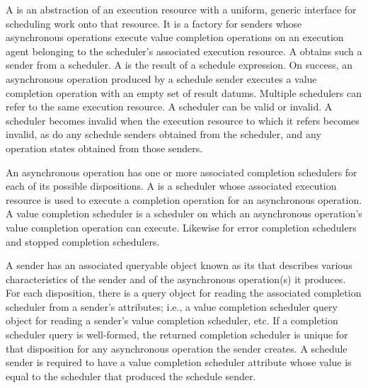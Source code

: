 \pnum
A  is an abstraction of an execution resource
with a uniform, generic interface for scheduling work onto that resource.
It is a factory for senders
whose asynchronous operations execute value completion operations
on an execution agent belonging to
the scheduler's associated execution resource.
A  obtains such a sender from a scheduler.
A  is the result of a schedule expression.
On success, an asynchronous operation produced by a schedule sender executes
a value completion operation with an empty set of result datums.
Multiple schedulers can refer to the same execution resource.
A scheduler can be valid or invalid.
A scheduler becomes invalid when the execution resource to which it refers
becomes invalid,
as do any schedule senders obtained from the scheduler, and
any operation states obtained from those senders.

\pnum
An asynchronous operation has one or more associated completion schedulers
for each of its possible dispositions.
A  is a scheduler
whose associated execution resource is used to execute
a completion operation for an asynchronous operation.
A value completion scheduler is a scheduler
on which an asynchronous operation's value completion operation can execute.
Likewise for error completion schedulers and stopped completion schedulers.

\pnum
A sender has an associated queryable object
known as its 
that describes various characteristics of the sender and
of the asynchronous operation(s) it produces.
For each disposition,
there is a query object for reading the associated completion scheduler
from a sender's attributes;
i.e., a value completion scheduler query object
for reading a sender's value completion scheduler, etc.
If a completion scheduler query is well-formed,
the returned completion scheduler is unique
for that disposition for any asynchronous operation the sender creates.
A schedule sender is required to have a value completion scheduler attribute
whose value is equal to the scheduler that produced the schedule sender.

